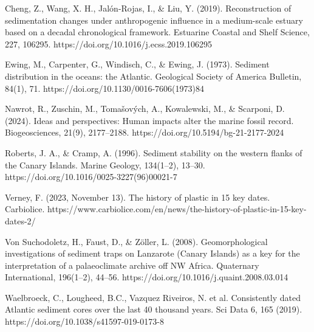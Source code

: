 \documentclass[twocolumn,a4paper,aps,amsmath,amssymb,floatfix,superscriptaddress]{revtex4-2}
\begin{document}
\begin{thebibliography}{10}
		Cheng, Z., Wang, X. H., Jalón-Rojas, I., \& Liu, Y. (2019). Reconstruction of sedimentation changes under anthropogenic influence in a medium-scale estuary based on a decadal chronological framework. Estuarine Coastal and Shelf Science, 227, 106295. https://doi.org/10.1016/j.ecss.2019.106295
		
		 Ewing, M., Carpenter, G., Windisch, C., \& Ewing, J. (1973). Sediment distribution in the oceans: the Atlantic. Geological Society of America Bulletin, 84(1), 71. https://doi.org/10.1130/0016-7606(1973)84
		
		Nawrot, R., Zuschin, M., Tomašových, A., Kowalewski, M., \& Scarponi, D. (2024). Ideas and perspectives: Human impacts alter the marine fossil record. Biogeosciences, 21(9), 2177–2188. https://doi.org/10.5194/bg-21-2177-2024
		
		 Roberts, J. A., \& Cramp, A. (1996). Sediment stability on the western flanks of the Canary Islands. Marine Geology, 134(1–2), 13–30. https://doi.org/10.1016/0025-3227(96)00021-7
		
		 Verney, F. (2023, November 13). The history of plastic in 15 key dates. Carbiolice. https://www.carbiolice.com/en/news/the-history-of-plastic-in-15-key-dates-2/
		
		 Von Suchodoletz, H., Faust, D., \& Zöller, L. (2008). Geomorphological investigations of sediment traps on Lanzarote (Canary Islands) as a key for the interpretation of a palaeoclimate archive off NW Africa. Quaternary International, 196(1–2), 44–56. https://doi.org/10.1016/j.quaint.2008.03.014
		
		Waelbroeck, C., Lougheed, B.C., Vazquez Riveiros, N. et al. Consistently dated Atlantic sediment cores over the last 40 thousand years. Sci Data 6, 165 (2019). https://doi.org/10.1038/s41597-019-0173-8
	\end{thebibliography}
	
\end{document}
